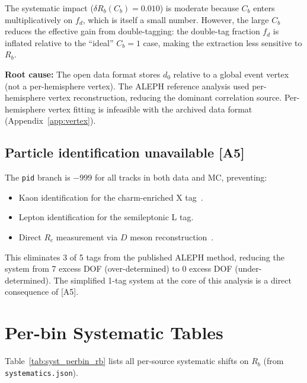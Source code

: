 \documentclass[11pt,a4paper]{article}
\begin{document}
The systematic impact ($\delta R_b(C_b) = 0.010$) is moderate because $C_b$ enters
multiplicatively on $f_d$, which is itself a small number. However, the large $C_b$
reduces the effective gain from double-tagging: the double-tag fraction $f_d$ is
inflated relative to the ``ideal'' $C_b = 1$ case, making the extraction less sensitive
to $R_b$.

\textbf{Root cause:} The open data format stores $d_0$ relative to a global event
vertex (not a per-hemisphere vertex). The ALEPH reference analysis used per-hemisphere
vertex reconstruction, reducing the dominant correlation source. Per-hemisphere vertex
fitting is infeasible with the archived data format (Appendix~\ref{app:vertex}).

\subsection{Particle identification unavailable [A5]}

The \texttt{pid} branch is $-999$ for all tracks in both data and MC, preventing:
\begin{itemize}
\item Kaon identification for the charm-enriched X tag~\cite{ALEPH:Rb:1996}.
\item Lepton identification for the semileptonic L tag.
\item Direct $R_c$ measurement via $D$ meson reconstruction~\cite{ALEPH:Rc}.
\end{itemize}

This eliminates 3 of 5 tags from the published ALEPH method, reducing the system from
7 excess DOF (over-determined) to 0 excess DOF (under-determined). The simplified
1-tag system at the core of this analysis is a direct consequence of [A5].

\clearpage


\clearpage
\appendix

\section{Per-bin Systematic Tables}
\label{app:syst-tables}

Table~\ref{tab:syst_perbin_rb} lists all per-source systematic shifts on $R_b$
(from \texttt{systematics.json}).
\end{document}
